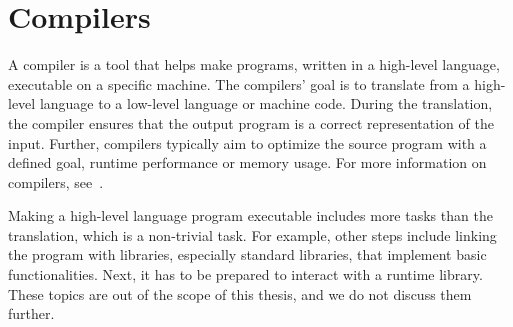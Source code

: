 \section{Compilers}
\label{sec:bg:compilers}
A compiler is a tool that helps make programs, written in a high-level language, executable on a specific machine.
The compilers' goal is to translate from a high-level language to a low-level language or machine code.
During the translation, the compiler ensures that the output program is a correct representation of the input.
Further, compilers typically aim to optimize the source program with a defined goal, \eg runtime performance or memory usage.
For more information on compilers, \eg see~\cite{engineeringcompiler2007}.

Making a high-level language program executable includes more tasks than the translation, which is a non-trivial task.
For example, other steps include linking the program with libraries, especially standard libraries, that implement basic functionalities.
Next, it has to be prepared to interact with a runtime library.
These topics are out of the scope of this thesis, and we do not discuss them further.

